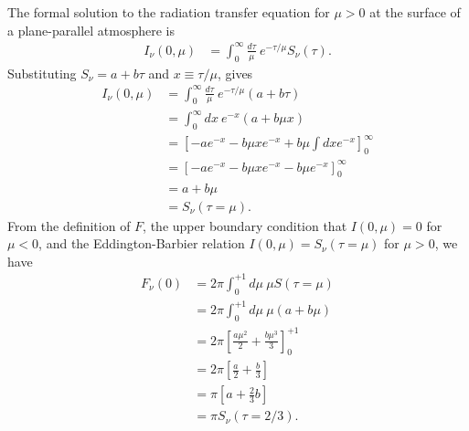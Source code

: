 \begin{problem}
The formal solution to the radiation transfer equation for $\mu > 0$ at the surface of a plane-parallel atmosphere is
\begin{align}
I_\nu(0,\mu) 
&= \int_0^\infty\!\!\!\frac{d\tau}{\mu}\:e^{-\tau/\mu}S_\nu(\tau).
\end{align}
Substituting $S_\nu = a + b\tau$ and $x \equiv \tau/\mu$, gives
\begin{align}
I_\nu(0,\mu) 
&= \int_0^\infty\!\!\!\frac{d\tau}{\mu}\:e^{-\tau/\mu}(a + b\tau)\\
&= \int_0^\infty\!\!\!dx\:e^{-x}(a + b\mu x)\\
&= \left[-ae^{-x} - b\mu xe^{-x} +b\mu \int\!\!\!dx e^{-x}\right]_0^\infty\\
&= \left[-ae^{-x} - b\mu xe^{-x} -b\mu e^{-x}\right]_0^\infty\\
&= a + b\mu\\
&= S_\nu(\tau = \mu).
\end{align}
From the definition of $F$, the upper boundary condition that $I(0,\mu) = 0$ for $\mu < 0$, and the Eddington-Barbier relation $I(0,\mu) = S_\nu(\tau=\mu)$ for $\mu > 0$, we have
\begin{align}
F_\nu(0) &= 2\pi\int_0^{+1}\!\!\!d\mu\:\mu S(\tau=\mu)\\
&= 2\pi\int_0^{+1}\!\!\!d\mu\:\mu(a + b\mu)\\
&=2\pi\left[\frac{a\mu^2}{2} + \frac{b\mu^3}{3}\right]_0^{+1}\\
&=2\pi\left[\frac{a}{2}+\frac{b}{3}\right]\\
&=\pi\left[a + \frac{2}{3}b\right]\\
&=\pi S_\nu(\tau=2/3).
\end{align}
\end{problem}

\newslide


